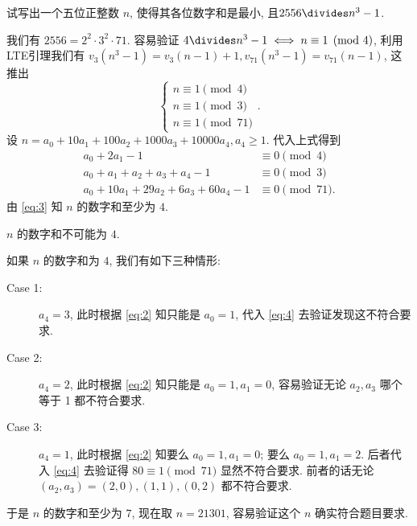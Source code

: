 \begin{prob}
\label{prob:prob-12}
试写出一个五位正整数 $n$, 使得其各位数字和是最小, 且$2556 \divides n^3 - 1$.
\end{prob}

\begin{soln}
我们有 $2556 = 2^2 \cdot 3^2 \cdot 71$.
容易验证 $4 \divides n^3 - 1 \iff n \equiv 1 \pmod{4}$,
利用LTE引理我们有 $v_{3}(n^3 - 1) = v_3(n - 1) + 1,
v_{71}(n^3 - 1) = v_{71}(n - 1)$, 这推出
\[
\begin{cases}
n \equiv 1 \pmod{4}\\
n \equiv 1 \pmod{3}\\
n \equiv 1 \pmod{71}
\end{cases}.
\]
设 $n = a_0 + 10a_1 + 100a_2 + 1000a_3 + 10000a_4, a_4\ge 1$.
代入上式得到
\begin{align}
\label{eq:2}
a_0 + 2a_1 - 1 &\equiv 0 \pmod{4} \\
\label{eq:3}
a_0 + a_1 + a_2 + a_3 + a_4 - 1 &\equiv 0 \pmod{3}	\\
\label{eq:4}
a_0 + 10a_1 + 29a_2 + 6a_3 + 60a_4 - 1 &\equiv 0 \pmod{71}.
\end{align}
由 \cref{eq:3} 知 $n$ 的数字和至少为 $4$.

\begin{claim}
$n$ 的数字和不可能为 $4$.
\end{claim}

\begin{subproof}
如果 $n$ 的数字和为 $4$, 我们有如下三种情形:
\begin{description}
\item[Case 1:] $a_4 = 3$, 此时根据 \cref{eq:2} 知只能是 $a_0 = 1$,
代入 \cref{eq:4} 去验证发现这不符合要求.
\item[Case 2:] $a_4 = 2$, 此时根据 \cref{eq:2} 知只能是 $a_0 = 1, a_1 = 0$,
容易验证无论 $a_2, a_3$ 哪个等于 1 都不符合要求.
\item[Case 3:] $a_4 = 1$, 此时根据 \cref{eq:2} 知要么 $a_0 = 1, a_1 = 0$;
要么 $a_0 = 1, a_1 = 2$. 后者代入 \cref{eq:4} 去验证得 $80 \equiv 1 \pmod{71}$
显然不符合要求. 前者的话无论 $(a_2, a_3) = (2, 0), (1, 1), (0, 2)$ 都不符合要求.
\end{description}
\end{subproof}

于是 $n$ 的数字和至少为 $7$, 现在取 $n = \boxed{21301}$,
容易验证这个 $n$ 确实符合题目要求.
\end{soln}
